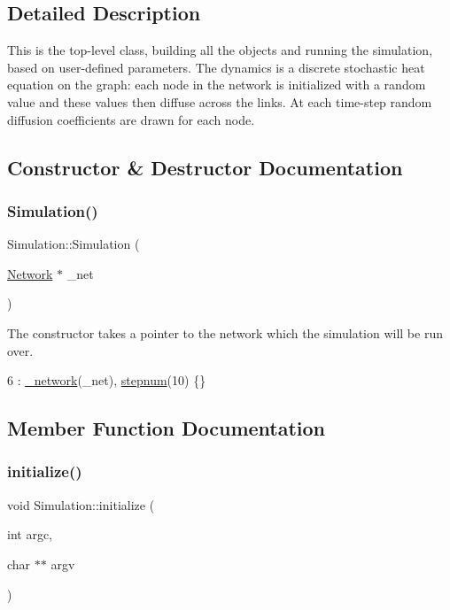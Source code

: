 \subsection{Detailed Description}
This is the top-\/level class, building all the objects and running the simulation, based on user-\/defined parameters. The dynamics is a discrete stochastic heat equation on the graph\+: each node in the network is initialized with a random value and these values then diffuse across the links. At each time-\/step random diffusion coefficients are drawn for each node. 

\subsection{Constructor \& Destructor Documentation}
\mbox{\label{classSimulation_a7441762ef8cc50b5d9a8f44c247a1116}} 
\subsubsection{\texorpdfstring{Simulation()}{Simulation()}}
{\footnotesize\ttfamily Simulation\+::\+Simulation (\begin{DoxyParamCaption}\item[{\mbox{\hyperlink{classNetwork}{Network}} $\ast$}]{\+\_\+net }\end{DoxyParamCaption})}

The constructor takes a pointer to the network which the simulation will be run over. 
\begin{DoxyCode}
6 : \mbox{\hyperlink{classSimulation_a5f1d8152b13bc4640c8a3fddcfe7eae9}{\_network}}(\_net), \mbox{\hyperlink{classSimulation_a6bfba2071d6358af042ca417637c6c36}{stepnum}}(10) \{\}
\end{DoxyCode}


\subsection{Member Function Documentation}
\mbox{\label{classSimulation_a348e5955b3c7937d21fc851cad347eb8}} 
\subsubsection{\texorpdfstring{initialize()}{initialize()}}
{\footnotesize\ttfamily void Simulation\+::initialize (\begin{DoxyParamCaption}\item[{int}]{argc,  }\item[{char $\ast$$\ast$}]{argv }\end{DoxyParamCaption})}

